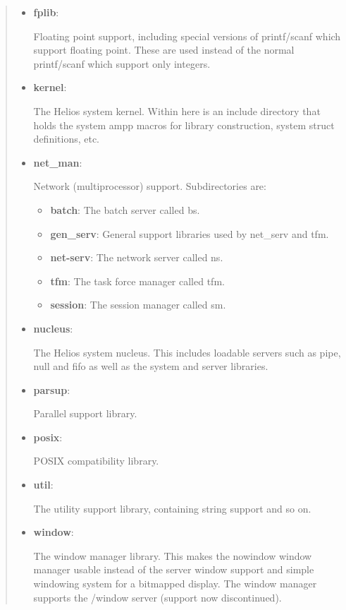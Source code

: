 \begin {quote}
\begin{itemize}
The Helios file system.


\item {\bf fplib}: 

Floating point support, including special versions of printf/scanf
which support floating point. These are used instead of the normal
printf/scanf which support only integers.

\item {\bf kernel}: 

The Helios system kernel. Within here is an include directory
that holds the system ampp macros for library construction, system struct
definitions, etc.

\item {\bf net\_man}: 

Network (multiprocessor) support. Subdirectories are:

\begin{itemize}
\item  {\bf batch}: The batch server called bs.
\item  {\bf gen\_serv}: General support libraries used by net\_serv and tfm.
\item  {\bf net-serv}: The network server called ns.
\item  {\bf tfm}: The task force manager called tfm.
\item  {\bf session}: The session manager called sm.
\end{itemize}

\item {\bf nucleus}: 

The Helios system nucleus. This includes loadable servers such
as pipe, null and fifo as well as the system and server libraries.

\item {\bf parsup}: 

Parallel support library.

\item {\bf posix}: 

POSIX compatibility library.

\item {\bf util}: 

The utility support library, containing string support and so on.

\item {\bf window}: 

The window manager library. This makes the nowindow window manager
usable instead of the server window support and simple windowing system
for a bitmapped display. The window manager supports the /window server
(support now discontinued).


\end{itemize}
\end{quote}
